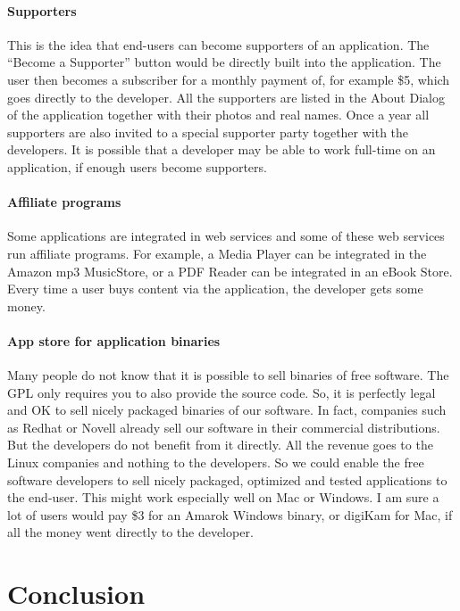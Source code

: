 \paragraph*{Supporters}

This is the idea that end-users can become supporters of an application. The ``Become a Supporter'' button would be directly built into the application. The user then becomes a subscriber for a monthly payment of, for example \$5, which goes directly to the developer. All the supporters are listed in the About Dialog of the application together with their photos and real names. Once a year all supporters are also invited to a special supporter party together with the developers. It is possible that a developer may be able to work full-time on an application, if enough users become supporters.

\paragraph*{Affiliate programs}

Some applications are integrated in web services and some of these web services run affiliate programs. For example, a Media Player can be integrated in the Amazon mp3 MusicStore, or a PDF Reader can be integrated in an eBook Store. Every time a user buys content via the application, the developer gets some money.

\paragraph*{App store for application binaries}

Many people do not know that it is possible to sell binaries of free software. The GPL only requires you to also provide the source code. So, it is perfectly legal and OK to sell nicely packaged binaries of our software. In fact, companies such as Redhat or Novell already sell our software in their commercial distributions. But the developers do not benefit from it directly. All the revenue goes to the Linux companies and nothing to the developers. So we could enable the free software developers to sell nicely packaged, optimized and tested applications to the end-user. This might work especially well on Mac or Windows. I am sure a lot of users would pay \$3 for an Amarok Windows binary, or digiKam for Mac, if all the money went directly to the developer.

\section*{Conclusion}


